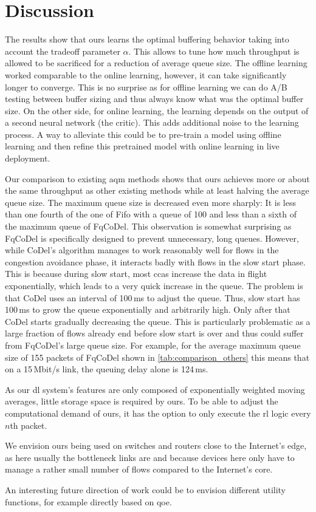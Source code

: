 \documentclass[conference]{IEEEtran}
\begin{document}
\section{Discussion}

The results show that \gls{ours} learns the optimal buffering behavior taking into account the tradeoff parameter $\alpha$. This allows to tune how much throughput is allowed to be sacrificed for a reduction of average queue size. The offline learning worked comparable to the online learning, however, it can take significantly longer to converge. This is no surprise as for offline learning we can do A/B testing between buffer sizing and thus always know what was the optimal buffer size. On the other side, for online learning, the learning depends on the output of a second neural network (the critic). This adds additional noise to the learning process. A way to alleviate this could be to pre-train a model using offline learning and then refine this pretrained model with online learning in live deployment. 

Our comparison to existing \gls{aqm} methods shows that \gls{ours} achieves more or about the same throughput as other existing methods while at least halving the average queue size. The maximum queue size is decreased even more sharply: It is less than one fourth of the one of Fifo with a queue of 100 and less than a sixth of the maximum queue of FqCoDel. This observation is somewhat surprising as FqCoDel is specifically designed to prevent unnecessary, long queues. However, while CoDel's algorithm manages to work reasonably well for flows in the congestion avoidance phase, it interacts badly with flows in the slow start phase. This is because during slow start, most \glspl{cca} increase the data in flight exponentially, which leads to a very quick increase in the queue. The problem is that CoDel uses an interval of 100\,ms to adjust the queue. Thus, slow start has 100\,ms to grow the queue exponentially and arbitrarily high. Only after that CoDel starts gradually decreasing the queue. This is particularly problematic as a large fraction of flows already end before slow start is over \cite{jurkiewicz_flow_2020} and thus could suffer from FqCoDel's large queue size. For example, for the average maximum queue size of 155 packets of FqCoDel shown in \autoref{tab:comparison_others} this means that on a 15\,Mbit/s link, the queuing delay alone is 124\,ms. 

As our \gls{dl} system's features are only composed of exponentially weighted moving averages, little storage space is required by \gls{ours}. To be able to adjust the computational demand of \gls{ours}, it has the option to only execute the \gls{rl} logic every $n$th packet.

We envision \gls{ours} being used on switches and routers close to the Internet's edge, as here usually the bottleneck links are and because devices here only have to manage a rather small number of flows compared to the Internet's core. 

An interesting future direction of work could be to envision different utility functions, for example directly based on \gls{qoe}. 



\end{document}
